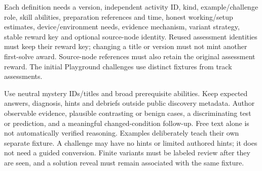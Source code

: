 Each definition needs a version, independent activity ID, kind, example/challenge
role, skill abilities, preparation references and time, honest working/setup
estimates, device/environment needs, evidence mechanism, variant strategy, stable
reward key and optional source-node identity. Reused assessment identities must
keep their reward key; changing a title or version must not mint another first-solve
award. Source-node references must also retain the original assessment reward.
The initial Playground challenges use distinct fixtures from track assessments.

Use neutral mystery IDs/titles and broad prerequisite abilities. Keep expected
answers, diagnosis, hints and debriefs outside public discovery metadata. Author
observable evidence, plausible contrasting or benign cases, a discriminating test
or prediction, and a meaningful changed-condition follow-up. Free text alone is
not automatically verified reasoning. Examples deliberately teach their own
separate fixture. A challenge may have no hints or limited authored hints; it does
not need a guided conversion. Finite variants must be labeled review after they
are seen, and a solution reveal must remain associated with the same fixture.
